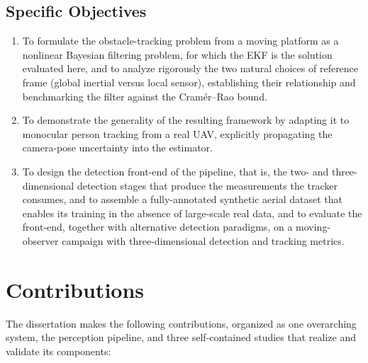 \subsection{Specific Objectives}

\begin{enumerate}
  \item To formulate the obstacle-tracking problem from a moving platform as a
  nonlinear Bayesian filtering problem, for which the EKF is the solution
  evaluated here, and to analyze
  rigorously the two natural choices of reference frame
  (global inertial versus local sensor), establishing their relationship and
  benchmarking the filter against the Cram\'er--Rao bound.
  \item To demonstrate the generality of the resulting framework by adapting it
  to monocular person tracking from a real UAV, explicitly propagating the
  camera-pose uncertainty into the estimator.
  \item To design the detection front-end of the pipeline, that is, the
  two- and three-dimensional detection stages that produce the measurements the
  tracker consumes, and to assemble a fully-annotated synthetic aerial dataset
  that enables its training in the absence of large-scale real data, and to
  evaluate the front-end, together with alternative detection paradigms, on a
  moving-observer campaign with three-dimensional detection and tracking metrics.
\end{enumerate}

\section{Contributions}

The dissertation makes the following contributions, organized as one overarching
system, the perception pipeline, and three self-contained studies that
realize and validate its components:

